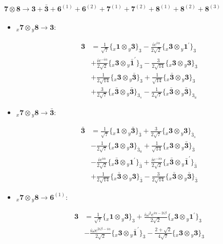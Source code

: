 \documentclass[english]{article}
\newcommand{\cgEqFontsize}{\large}
\newcommand{\rep}[1]{\mathbf{#1}}
\newcommand{\repx}[2]{{}_{#2}\mathbf{#1}}
\newcommand{\tsprod}[2]{\rep{#1}\otimes\rep{#2}}
\newcommand{\tsprodx}[2]{\repx{#1}{x}\otimes\repx{#2}{y}}
\newcommand{\subcgt}[3]{\big\{ \tsprodx{#1}{#2}\big\}^{}_{#3}}
\begin{document}
\paragraph*{\cgEqFontsize $\tsprod{7}{8}\to\rep{3}+\rep{\bar{3}}+\rep{6}^{(1)}+\rep{6}^{(2)}+\rep{7}^{(1)}+\rep{7}^{(2)}+\rep{8}^{(1)}+\rep{8}^{(2)}+\rep{8}^{(3)}$}
\begin{itemize}
\item $\tsprodx{7}{8}\to\rep{3}$:
\begin{fleqn}
\begin{align*}
\rep{3} & = \frac{1}{\sqrt{7}}\subcgt{1}{3}{3}-\frac{i e^{i \alpha }}{2 \sqrt{2}}\subcgt{3}{1^{\prime}}{3} \\ 
 & +\frac{i e^{-i \alpha }}{2 \sqrt{2}}\subcgt{3}{\bar{1}^{\prime}}{3}-\frac{3}{2 \sqrt{14}}\subcgt{3}{3}{3} \\ 
 & +\frac{1}{2 \sqrt{14}}\subcgt{3}{\bar{3}}{3}+\frac{1}{\sqrt{14}}\subcgt{\bar{3}}{3}{3} \\ 
 & +\frac{3}{2 \sqrt{7}}\subcgt{\bar{3}}{\bar{3}}{3_{s}}-\frac{1}{2 \sqrt{7}}\subcgt{\bar{3}}{\bar{3}}{3_{a}}
\end{align*}
\end{fleqn}
\item $\tsprodx{7}{8}\to\rep{\bar{3}}$:
\begin{fleqn}
\begin{align*}
\rep{\bar{3}} & = \frac{1}{\sqrt{7}}\subcgt{1}{\bar{3}}{\bar{3}}+\frac{3}{2 \sqrt{7}}\subcgt{3}{3}{\bar{3}_{s}} \\ 
 & -\frac{1}{2 \sqrt{7}}\subcgt{3}{3}{\bar{3}_{a}}+\frac{1}{\sqrt{14}}\subcgt{3}{\bar{3}}{\bar{3}} \\ 
 & -\frac{i e^{i \alpha }}{2 \sqrt{2}}\subcgt{\bar{3}}{1^{\prime}}{\bar{3}}+\frac{i e^{-i \alpha }}{2 \sqrt{2}}\subcgt{\bar{3}}{\bar{1}^{\prime}}{\bar{3}} \\ 
 & +\frac{1}{2 \sqrt{14}}\subcgt{\bar{3}}{3}{\bar{3}}-\frac{3}{2 \sqrt{14}}\subcgt{\bar{3}}{\bar{3}}{\bar{3}}
\end{align*}
\end{fleqn}
\item $\tsprodx{7}{8}\to\rep{6}^{(1)}$:
\begin{fleqn}
\begin{align*}
\rep{3} & = \frac{1}{\sqrt{7}}\subcgt{1}{3}{3}+\frac{i \omega ^2 e^{i \alpha -2 i \beta }}{2 \sqrt{2}}\subcgt{3}{1^{\prime}}{3} \\ 
 & -\frac{i \omega  e^{2 i \beta -i \alpha }}{2 \sqrt{2}}\subcgt{3}{\bar{1}^{\prime}}{3}-\frac{2+\sqrt{2}}{4 \sqrt{7}}\subcgt{3}{3}{3} \\ 

\end{align*}
\end{fleqn}
\end{itemize}
\end{document}
